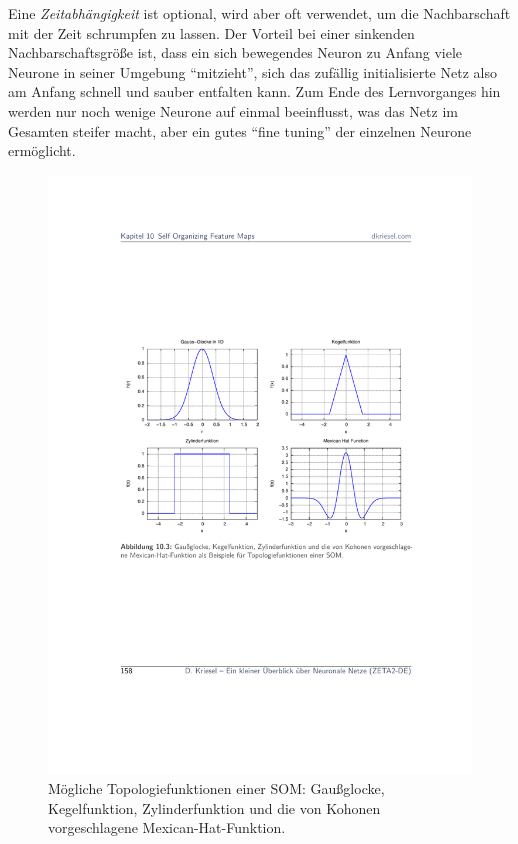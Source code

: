 Eine \emph{Zeitabhängigkeit} ist optional, wird aber oft verwendet, um die Nachbarschaft mit der Zeit schrumpfen zu lassen.
Der Vorteil bei einer sinkenden Nachbarschaftsgröße ist, dass ein sich bewegendes Neuron zu Anfang viele Neurone in seiner Umgebung "`mitzieht"', sich das zufällig initialisierte Netz also am Anfang schnell und sauber entfalten kann.
Zum Ende des Lernvorganges hin werden nur noch wenige Neurone auf einmal beeinflusst, was das Netz im Gesamten steifer macht, aber ein gutes "`fine tuning"' der einzelnen Neurone ermöglicht.

\begin{figure}[ht!] \centering 
	\includegraphics[width=\linewidth]{figures/ch08_som-topologiefunktionen.pdf}
	\caption{Mögliche Topologiefunktionen einer SOM: Gaußglocke, Kegelfunktion, Zylinderfunktion und die von Kohonen vorgeschlagene Mexican-Hat-Funktion.}
	\label{fig:ch08_som-topologiefunktionen}
\end{figure}


